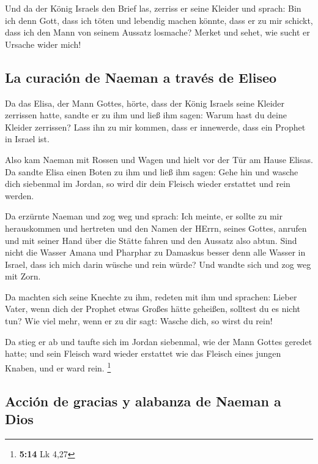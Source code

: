  Und da der König Israels den Brief las, zerriss er seine
Kleider und sprach: Bin ich denn Gott, dass ich töten und lebendig
machen könnte, dass er zu mir schickt, dass ich den Mann von seinem
Aussatz losmache? Merket und sehet, wie sucht er Ursache wider mich!

\hypertarget{la-curaciuxf3n-de-naeman-a-travuxe9s-de-eliseo}{%
\subsection{La curación de Naeman a través de
Eliseo}\label{la-curaciuxf3n-de-naeman-a-travuxe9s-de-eliseo}}

 Da das Elisa, der Mann Gottes, hörte, dass der König
Israels seine Kleider zerrissen hatte, sandte er zu ihm und ließ ihm
sagen: Warum hast du deine Kleider zerrissen? Lass ihn zu mir kommen,
dass er innewerde, dass ein Prophet in Israel ist.

 Also kam Naeman mit Rossen und Wagen und hielt vor der
Tür am Hause Elisas.  Da sandte Elisa einen Boten zu ihm
und ließ ihm sagen: Gehe hin und wasche dich siebenmal im Jordan, so
wird dir dein Fleisch wieder erstattet und rein werden.

 Da erzürnte Naeman und zog weg und sprach: Ich meinte,
er sollte zu mir herauskommen und hertreten und den Namen der HErrn,
seines Gottes, anrufen und mit seiner Hand über die Stätte fahren und
den Aussatz also abtun.  Sind nicht die Wasser Amana und
Pharphar zu Damaskus besser denn alle Wasser in Israel, dass ich mich
darin wüsche und rein würde? Und wandte sich und zog weg mit Zorn.

 Da machten sich seine Knechte zu ihm, redeten mit ihm
und sprachen: Lieber Vater, wenn dich der Prophet etwas Großes hätte
geheißen, solltest du es nicht tun? Wie viel mehr, wenn er zu dir sagt:
Wasche dich, so wirst du rein!

 Da stieg er ab und taufte sich im Jordan siebenmal, wie
der Mann Gottes geredet hatte; und sein Fleisch ward wieder erstattet
wie das Fleisch eines jungen Knaben, und er ward rein. \footnote{\textbf{5:14}
  Lk 4,27}

\hypertarget{acciuxf3n-de-gracias-y-alabanza-de-naeman-a-dios}{%
\subsection{Acción de gracias y alabanza de Naeman a
Dios}\label{acciuxf3n-de-gracias-y-alabanza-de-naeman-a-dios}}

